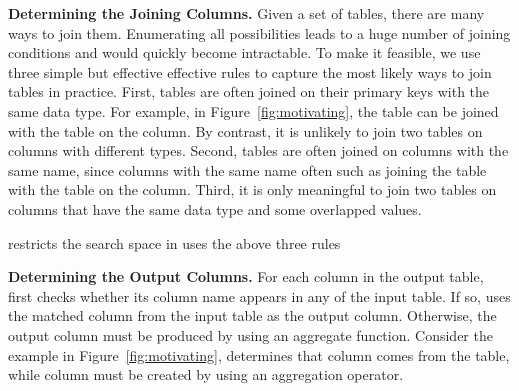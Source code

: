 \vspace{1mm}
{\textbf{Determining the Joining Columns. }} Given a set of tables,
there are many ways to join them. Enumerating all possibilities
leads to a huge number of joining conditions and would quickly
become intractable. To make it feasible, we use
three simple but effective effective rules to capture
the most likely ways to join tables in practice.
First, tables are often joined on their primary keys with
the same data type. For example, in Figure~\ref{fig:motivating},
the  table can be joined with the 
table on the  column.
By contrast, it is unlikely to join two tables on columns
with different types. Second, tables are often joined
on columns with the same name, since columns with the same name
often such as joining the  table
with the  table on the
 column. Third, it is only meaningful
to join two tables on columns that have the same data type and some
overlapped values. 

\ourtool restricts the search space in uses the above three rules 


{\textbf{Determining the Output Columns.}} For each
column in the output table, \ourtool first checks whether
its column name appears in any of the input table.
If so, \ourtool uses the matched column from the input
table as the output column.
Otherwise, the output column
must be produced by using an aggregate function.
Consider the example in Figure~\ref{fig:motivating},
\ourtool determines that column {} comes from the 
table, while column {} must be created by using an aggregation operator.

